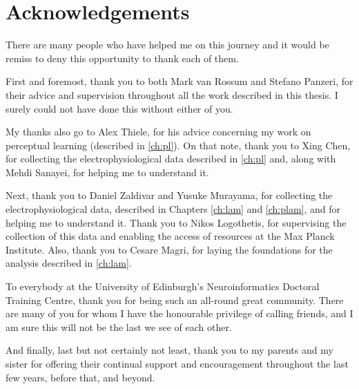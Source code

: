 

\begingroup

\let\clearpage\relax
\let\cleardoublepage\relax
\let\cleardoublepage\relax

\chapter*{Acknowledgements} %

There are many people who have helped me on this journey and it would be remiss to deny this opportunity to thank each of them.

First and foremost, thank you to both Mark van Rossum and Stefano Panzeri, for their advice and supervision throughout all the work described in this thesis.
I surely could not have done this without either of you.

My thanks also go to Alex Thiele, for his advice concerning my work on perceptual learning (described in \autoref{ch:pl}).
On that note, thank you to Xing Chen, for collecting the electrophysiological data described in \autoref{ch:pl} and, along with Mehdi Sanayei, for helping me to understand it.

Next, thank you to Daniel Zaldivar and Yusuke Murayama, for collecting the electrophysiological data, described in Chapters \ref{ch:lam} and \ref{ch:plam}, and for helping me to understand it.
Thank you to Nikos Logothetis, for supervising the collection of this data and enabling the access of resources at the Max Planck Institute.
Also, thank you to Cesare Magri, for laying the foundations for the analysis described in \autoref{ch:lam}.

To everybody at the University of Edinburgh's Neuroinformatics Doctoral Training Centre, thank you for being such an all-round great community.
There are many of you for whom I have the honourable privilege of calling friends, and I am sure this will not be the last we see of each other.

And finally, last but not certainly not least, thank you to my parents and my sister for offering their continual support and encouragement throughout the last few years, before that, and beyond.

\endgroup
